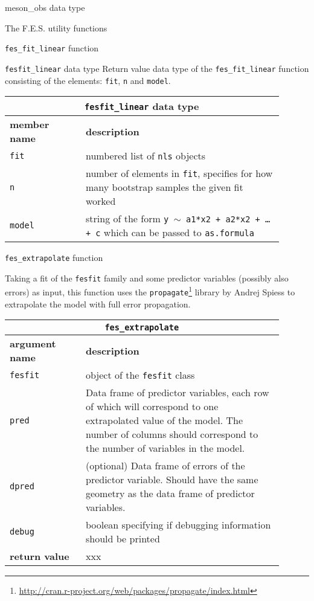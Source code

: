 \documentclass[10pt,a4paper]{article}
\begin{document}
\begin{section}{{\ttfamily meson\_obs} data type}
\begin{section}{The F.E.S. utility functions}
\begin{subsection}{ {\tt fes\_fit\_linear} function }
\end{subsection}

\begin{subsection}{ {\tt fesfit\_linear} data type }
Return value data type of the {\tt fes\_fit\_linear} function consisting of the elements: {\tt fit}, {\tt n} and {\tt model}.

{ \centering
\begin{tabular}{|p{0.25\linewidth}|p{0.65\linewidth}|}
\hline
\multicolumn{2}{|c|}{ {\tt fesfit\_linear} data type } \\
\hline \hline \textbf{member name} & \textbf{description} \\ \hline
{\tt fit} & numbered list of {\tt nls} objects \\ 
{\tt n}  & number of elements in {\tt fit}, specifies for how many bootstrap samples the given fit worked \\ 
{\tt model} & string of the form {\tt y $\sim$ a1*x2 + a2*x2 + \ldots + c} which can be passed to {\tt as.formula} \\
\hline 
\end{tabular}
} %

\end{subsection}

\begin{subsection}{ {\tt fes\_extrapolate} function }

Taking a fit of the {\tt fesfit} family and some predictor variables (possibly also errors) as input, this function uses the {\tt propagate}\footnote{\url{http://cran.r-project.org/web/packages/propagate/index.html}} library by Andrej Spiess to extrapolate the model with full error propagation.

{ \centering
\begin{tabular}{|p{0.25\linewidth}|p{0.65\linewidth}|}
\hline
\multicolumn{2}{|c|}{ {\tt fes\_extrapolate} } \\
\hline \hline \textbf{argument name} & \textbf{description} \\
\hline {\tt fesfit} & object of the {\tt fesfit} class \\ 
{\tt pred} & Data frame of predictor variables, each row of which will correspond to one extrapolated value of the model. The number of columns should correspond to the number of variables in the model. \\ 
{\tt dpred} & (optional) Data frame of errors of the predictor variable. Should have the same geometry as the data frame of predictor variables. \\ 
{\tt debug} & boolean specifying if debugging information should be printed \\
\hline \hline
\textbf{return value} & xxx \\
\hline
\end{tabular}
}


\end{subsection}
\end{section}
\end{section}
\end{document}

